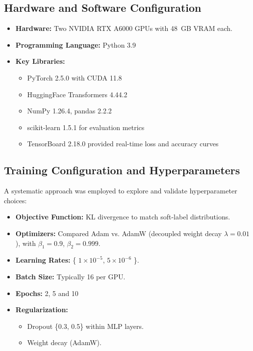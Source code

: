 \subsection*{Hardware and Software Configuration}
\begin{itemize}
    \item \textbf{Hardware:} Two NVIDIA RTX A6000 GPUs with 48~GB VRAM each.
    \item \textbf{Programming Language:} Python 3.9
    \item \textbf{Key Libraries:}
    \begin{itemize}
        \item PyTorch 2.5.0 with CUDA 11.8
        \item HuggingFace Transformers 4.44.2
        \item NumPy 1.26.4, pandas 2.2.2
        \item scikit-learn 1.5.1 for evaluation metrics
        \item TensorBoard 2.18.0 provided real-time loss and accuracy curves
    \end{itemize}
\end{itemize}

\subsection*{Training Configuration and Hyperparameters}
A systematic approach was employed to explore and validate hyperparameter choices:
\begin{itemize}
    \item \textbf{Objective Function:} KL divergence to match soft-label distributions.
    \item \textbf{Optimizers:} Compared Adam vs. AdamW (decoupled weight decay $\lambda=0.01$), with $\beta_1=0.9$, $\beta_2=0.999$.
    \item \textbf{Learning Rates:} \{ $1 \times 10^{-5}$, $5 \times 10^{-6}$ \}.
    \item \textbf{Batch Size:} Typically 16 per GPU.
    \item \textbf{Epochs:} 2, 5 and 10
    \item \textbf{Regularization:}
    \begin{itemize}
        \item Dropout \{0.3, 0.5\} within MLP layers.
        \item Weight decay (AdamW).
    \end{itemize}
\end{itemize}

